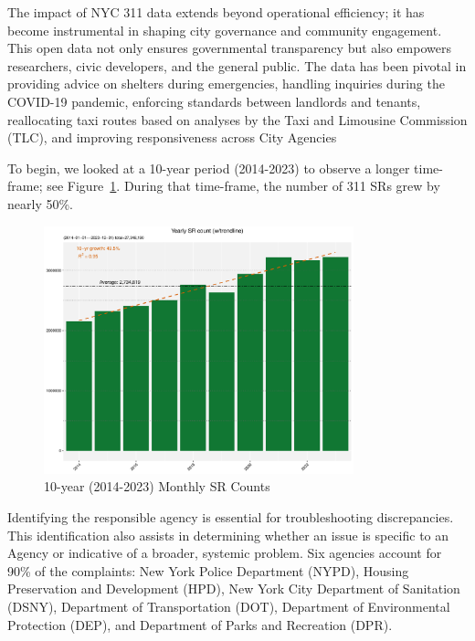 \documentclass[linenumber]{jdsart}
\begin{document}

The impact of NYC 311 data extends beyond operational efficiency; it
has become instrumental in shaping city governance and community
engagement. This open data not only ensures governmental transparency
but also empowers researchers, civic developers, and the general
public. The data has been pivotal in providing advice on shelters
during emergencies, handling inquiries during the COVID-19 pandemic,
enforcing standards between landlords and tenants, reallocating taxi
routes based on analyses by the Taxi and Limousine Commission (TLC),
and improving responsiveness across City Agencies

To begin, we looked at a 10-year period (2014-2023) to
observe a longer time-frame; see
Figure~\ref{fig:10-yr-monthly}. During that time-frame,
the number of 311 SRs grew by nearly 50\%.


\begin{figure}[tbp]
	\centering
  	\includegraphics[width=0.8\textwidth]{10-year-trend_yearly.pdf}
 	\caption{10-year (2014-2023) Monthly SR Counts}
  	\label{fig:10-yr-monthly}
\end{figure}



Identifying the responsible agency is essential 
for troubleshooting discrepancies. This identification also assists in 
determining whether an issue is specific to an Agency or indicative 
of a broader, systemic problem. Six agencies account for 90\% of 
the complaints: New York Police Department (NYPD), 
Housing Preservation and Development (HPD),
New York City Department of Sanitation (DSNY), Department of
Transportation (DOT), Department of Environmental Protection (DEP),
and Department of Parks and Recreation (DPR).
\end{document}
